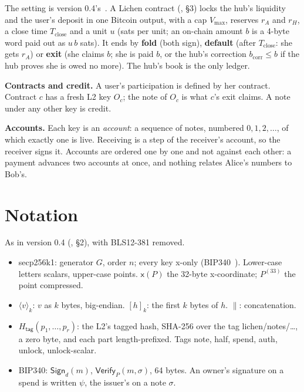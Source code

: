 \documentclass[11pt]{article}
\theoremstyle{plain}
\theoremstyle{definition}
\newcommand{\vmax}{V_{\max}}
\newcommand{\Tc}{T_{\mathrm{close}}}
\newcommand{\bcorr}{b_{\mathrm{corr}}}
\newcommand{\be}[2]{\langle #1\rangle_{#2}}
\newcommand{\pre}[2]{[#1]_{#2}}
\newcommand{\xo}[1]{\mathsf{x}(#1)}
\newcommand{\Ht}[1]{H_{\textsf{#1}}}
\newcommand{\Sign}{\mathsf{Sign}}
\newcommand{\Vfy}{\mathsf{Verify}}
\newcommand{\Oc}{O_c}
\begin{document}
The setting is version 0.4's~\cite{grants04}. A Lichen contract
(\cite{lichen}, \S3) locks the hub's liquidity and the user's deposit in
one Bitcoin output, with a cap $\vmax$, reserves $r_A$ and $r_H$, a
close time $\Tc$ and a unit $u$ (sats per unit; an on-chain amount $b$
is a 4-byte word paid out as $u\,b$ sats). It ends by \textbf{fold}
(both sign), \textbf{default} (after $\Tc$: she gets $r_A$) or
\textbf{exit} (she claims $b$; she is paid $b$, or the hub's correction
$\bcorr \le b$ if the hub proves she is owed no more). The hub's book is the
only ledger.

\textbf{Contracts and credit.} A user's participation is defined by her
contract. Contract $c$ has a fresh L2 key $\Oc$; the note of $\Oc$ is
what $c$'s exit claims. A note under any other key is credit.

\textbf{Accounts.} Each key is an \emph{account}: a sequence of notes,
numbered $0, 1, 2, \dots$, of which exactly one is live. Receiving is a
step of the receiver's account, so the receiver signs it. Accounts are
ordered one by one and not against each other: a payment advances two
accounts at once, and nothing relates Alice's numbers to Bob's.

\section{Notation}\label{sec:notation}

As in version 0.4 (\cite{grants04}, \S2), with BLS12-381 removed.

\begin{itemize}[nosep]
\item secp256k1: generator $G$, order $n$; every key x-only
  (BIP340~\cite{bip340}). Lower-case letters scalars, upper-case points.
  $\xo{P}$ the 32-byte x-coordinate; $P^{(33)}$ the point compressed.
\item $\be{v}{k}$: $v$ as $k$ bytes, big-endian. $\pre{h}{k}$: the first
  $k$ bytes of $h$. $\|$: concatenation.
\item $\Ht{tag}(p_1, \dots, p_r)$: the L2's tagged hash, SHA-256 over the
  tag \textsf{lichen/notes/\ldots}, a zero byte, and each part
  length-prefixed. Tags \textsf{note}, \textsf{half}, \textsf{spend},
  \textsf{auth}, \textsf{unlock}, \textsf{unlock-scalar}.
\item BIP340: $\Sign_d(m)$, $\Vfy_P(m, \sigma)$, 64 bytes. An owner's
  signature on a spend is written $\psi$, the issuer's on a note
  $\sigma$.
\end{itemize}
\end{document}
